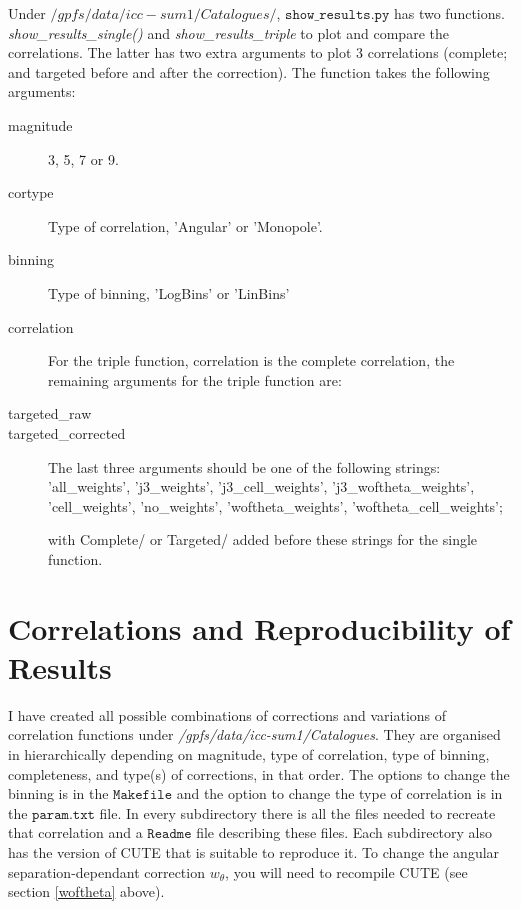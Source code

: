 \documentclass[12pt,helvetica,margin=2.5cm,a4paper,final]{iopart}
\begin{document}
Under $/gpfs/data/icc-sum1/Catalogues/$, $\mathtt{show\_results.py}$ has two functions. \emph{show\_results\_single()} and \emph{show\_results\_triple} to plot and compare the correlations. The latter has two extra arguments to plot 3 correlations (complete; and targeted before and after the correction). The function takes the following arguments:
\begin{description}

\item[magnitude] 3, 5, 7 or 9.

\item[cortype] Type of correlation, 'Angular' or 'Monopole'.

\item[binning] Type of binning, 'LogBins' or 'LinBins'

\item[correlation]

For the triple function, correlation is the complete correlation, the remaining arguments for the triple function are:

\item[targeted\_raw]
\item[targeted\_corrected]
The last three arguments should be one of the following strings:
'all\_weights', 'j3\_weights', 'j3\_cell\_weights', 'j3\_woftheta\_weights', 'cell\_weights', 'no\_weights', 'woftheta\_weights', 'woftheta\_cell\_weights';
 
with Complete/ or Targeted/ added before these strings for the single function.

\end{description}

\section{Correlations and Reproducibility of Results}
I have created all possible combinations of corrections and variations of correlation functions under \emph{/gpfs/data/icc-sum1/Catalogues}. They are organised in hierarchically depending on magnitude, type of correlation, type of binning, completeness, and type(s) of corrections, in that order. The options to change the binning is in the $\mathtt{Makefile}$ and the option to change the type of correlation is in the $\mathtt{param.txt}$ file. In every subdirectory there is all the files needed to recreate that correlation and a $\mathtt{Readme}$ file describing these files. Each subdirectory also has the version of CUTE that is suitable to reproduce it. To change the angular separation-dependant correction $w_\theta$, you will need to recompile CUTE (see section \ref{woftheta} above).
\end{document}
